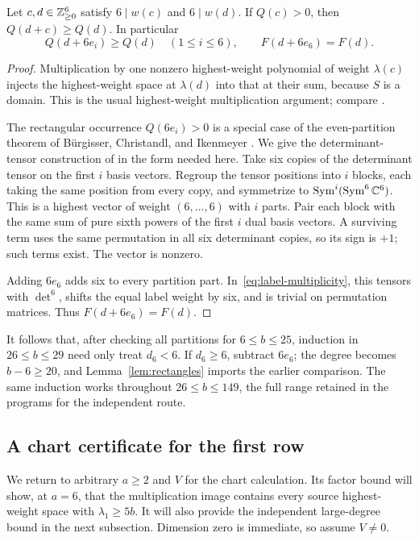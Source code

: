 \begin{lemma}\label{lem:rectangles}
Let \(c,d\in\mathbb Z_{\ge0}^6\) satisfy \(6\mid w(c)\) and \(6\mid w(d)\).
If \(Q(c)>0\), then \(Q(d+c)\ge Q(d)\). In particular
\[
          Q(d+6e_i)\ge Q(d)\quad(1\le i\le6),
          \qquad F(d+6e_6)=F(d).
\]
\end{lemma}
\begin{proof}
Multiplication by one nonzero highest-weight polynomial of weight
\(\lambda(c)\) injects the highest-weight space at \(\lambda(d)\)
into that at their sum, because \(S\) is a domain.
This is the usual highest-weight multiplication argument; compare
\cite[preprint, Lemma~2.2]{BurgisserIkenmeyerPanova2019}.

The rectangular occurrence \(Q(6e_i)>0\) is a special case of the
even-partition theorem of B\"urgisser, Christandl, and Ikenmeyer
\cite[Section~1.1, Theorem]{BurgisserChristandlIkenmeyer2011}.
We give the determinant-tensor construction of
\cite[preprint, Corollary~4.8]{BurgisserIkenmeyerPanova2019}
in the form needed here. Take six copies of the determinant tensor on
the first \(i\) basis vectors. Regroup the tensor positions into \(i\)
blocks, each taking the same position from every copy, and symmetrize
to \(\operatorname{Sym}^i(\operatorname{Sym}^6\mathbb C^6)\). This is a highest vector of weight
\((6,\ldots,6)\) with \(i\) parts. Pair each block with the same sum of
pure sixth powers of the first \(i\) dual basis vectors. A surviving
term uses the same permutation in all six determinant copies, so its
sign is \(+1\); such terms exist. The vector is nonzero.

Adding \(6e_6\) adds six to every partition part.
In~\eqref{eq:label-multiplicity}, this tensors with \(\det^6\),
shifts the equal label weight by six, and is trivial on permutation
matrices. Thus \(F(d+6e_6)=F(d)\).
\end{proof}

It follows that, after checking all partitions for \(6\le b\le25\),
induction in \(26\le b\le29\) need only treat \(d_6<6\).
If \(d_6\ge6\), subtract \(6e_6\); the degree becomes \(b-6\ge20\),
and Lemma~\ref{lem:rectangles} imports the earlier comparison.
The same induction works throughout \(26\le b\le149\), the full
range retained in the programs for the independent route.

\subsection{A chart certificate for the first row}
We return to arbitrary \(a\ge2\) and \(V\) for the chart calculation.
Its factor bound will show, at \(a=6\), that the multiplication image
contains every source highest-weight space with \(\lambda_1\ge5b\).
It will also provide the independent large-degree bound in the next
subsection. Dimension zero is immediate, so assume \(V\ne0\).

